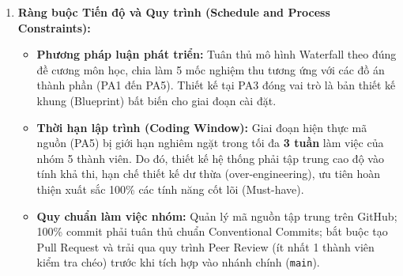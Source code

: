 \begin{enumerate}[label=\arabic*.,leftmargin=1.5em,itemsep=5pt]
  \item \textbf{Ràng buộc Tiến độ và Quy trình (Schedule and Process Constraints):}
  \begin{itemize}[label=\textbullet,leftmargin=1.2em,itemsep=3pt]
    \item \textbf{Phương pháp luận phát triển:} Tuân thủ mô hình Waterfall theo đúng đề cương môn học, chia làm 5 mốc nghiệm thu tương ứng với các đồ án thành phần (PA1 đến PA5). Thiết kế tại PA3 đóng vai trò là bản thiết kế khung (Blueprint) bất biến cho giai đoạn cài đặt.
    \item \textbf{Thời hạn lập trình (Coding Window):} Giai đoạn hiện thực mã nguồn (PA5) bị giới hạn nghiêm ngặt trong tối đa \textbf{3 tuần} làm việc của nhóm 5 thành viên. Do đó, thiết kế hệ thống phải tập trung cao độ vào tính khả thi, hạn chế thiết kế dư thừa (over-engineering), ưu tiên hoàn thiện xuất sắc 100\% các tính năng cốt lõi (Must-have).
    \item \textbf{Quy chuẩn làm việc nhóm:} Quản lý mã nguồn tập trung trên GitHub; 100\% commit phải tuân thủ chuẩn Conventional Commits; bắt buộc tạo Pull Request và trải qua quy trình Peer Review (ít nhất 1 thành viên kiểm tra chéo) trước khi tích hợp vào nhánh chính (\texttt{main}).
  \end{itemize}
\end{enumerate}
